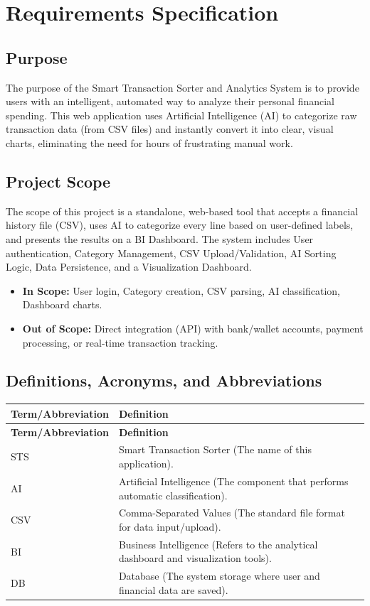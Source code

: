 \documentclass[11pt,a4paper]{report}
\begin{document}
\chapter{Requirements Specification}

\section{Purpose}
The purpose of the Smart Transaction Sorter and Analytics System is to provide users with an intelligent, automated way to analyze their personal financial spending. This web application uses Artificial Intelligence (AI) to categorize raw transaction data (from CSV files) and instantly convert it into clear, visual charts, eliminating the need for hours of frustrating manual work.

\section{Project Scope}
The scope of this project is a standalone, web-based tool that accepts a financial history file (CSV), uses AI to categorize every line based on user-defined labels, and presents the results on a BI Dashboard. The system includes User authentication, Category Management, CSV Upload/Validation, AI Sorting Logic, Data Persistence, and a Visualization Dashboard.

\begin{itemize}
	\item \textbf{In Scope:} User login, Category creation, CSV parsing, AI classification, Dashboard charts.
	\item \textbf{Out of Scope:} Direct integration (API) with bank/wallet accounts, payment processing, or real-time transaction tracking.
\end{itemize}

\section{Definitions, Acronyms, and Abbreviations}
\renewcommand{\arraystretch}{1.5}
\begin{longtable}{|p{4cm}|p{10.5cm}|}
	\hline
	\textbf{Term/Abbreviation} & \textbf{Definition} \\
	\hline
	\endfirsthead
	\hline
	\textbf{Term/Abbreviation} & \textbf{Definition} \\
	\hline
	\endhead
	STS & Smart Transaction Sorter (The name of this application). \\ \hline
	AI & Artificial Intelligence (The component that performs automatic classification). \\ \hline
	CSV & Comma-Separated Values (The standard file format for data input/upload). \\ \hline
	BI & Business Intelligence (Refers to the analytical dashboard and visualization tools). \\ \hline
	DB & Database (The system storage where user and financial data are saved). \\ \hline
\end{longtable}
\end{document}

